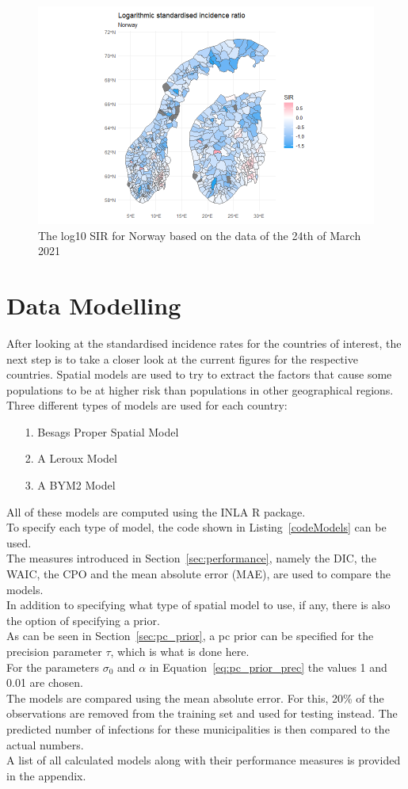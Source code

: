 \begin{figure}[H]
 \centering
 \includegraphics[width = 1.2\textwidth]{sir_norway_log.png}
 \caption{The log10 SIR for Norway based on the data of the 24th of March 2021}
 \label{sirnorwaylog}
\end{figure}
\clearpage
\section{Data Modelling}
After looking at the standardised incidence rates for the countries of interest, the next step is to take a closer look at the current figures for the respective countries. Spatial models are used to try to extract the factors that cause some populations to be at higher risk than populations in other geographical regions. Three different types of models are used for each country:
\begin{itemize}
  \item[1.] Besags Proper Spatial Model
  \item[2.] A Leroux Model
  \item[3.] A BYM2 Model
\end{itemize}
All of these models are computed using the INLA \cite{rinla} R package. \\
To specify each type of model, the code shown in Listing~\ref{codeModels} can be used. \\
The measures introduced in Section~\ref{sec:performance}, namely the DIC, the WAIC, the CPO and the mean absolute error (MAE), are used to compare the models.\\
In addition to specifying what type of spatial model to use, if any, there is also the option of specifying a prior. \\
As can be seen in Section~\ref{sec:pc_prior}, a pc prior can be specified for the precision parameter $\tau$, which is what is done here. \\
For the parameters $\sigma_0$ and $\alpha$ in Equation~\ref{eq:pc_prior_prec} the values 1 and 0.01 are chosen. \\
The models are compared using the mean absolute error. For this, 20\% of the observations are removed from the training set and used for testing instead. The predicted number of infections for these municipalities is then compared to the actual numbers.
\\
A list of all calculated models along with their performance measures is provided in the appendix.
